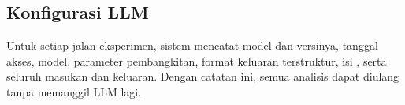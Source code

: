 \subsection{Konfigurasi LLM}
\label{subsec:konfigurasi}

Untuk setiap jalan eksperimen, sistem mencatat model dan versinya, tanggal akses,  model, parameter pembangkitan, format keluaran terstruktur, isi , serta seluruh masukan dan keluaran. Dengan catatan ini, semua analisis dapat diulang tanpa memanggil LLM lagi.

